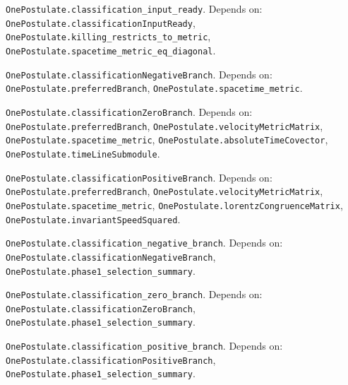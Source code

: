 \begin{lemma}\label{OnePostulate.classification_input_ready}
\texttt{OnePostulate.classification\_input\_ready}. Depends on: \texttt{OnePostulate.classificationInputReady}, \texttt{OnePostulate.killing\_restricts\_to\_metric}, \texttt{OnePostulate.spacetime\_metric\_eq\_diagonal}.
\end{lemma}

\begin{definition}\label{OnePostulate.classificationNegativeBranch}
\texttt{OnePostulate.classificationNegativeBranch}. Depends on: \texttt{OnePostulate.preferredBranch}, \texttt{OnePostulate.spacetime\_metric}.
\end{definition}

\begin{definition}\label{OnePostulate.classificationZeroBranch}
\texttt{OnePostulate.classificationZeroBranch}. Depends on: \texttt{OnePostulate.preferredBranch}, \texttt{OnePostulate.velocityMetricMatrix}, \texttt{OnePostulate.spacetime\_metric}, \texttt{OnePostulate.absoluteTimeCovector}, \texttt{OnePostulate.timeLineSubmodule}.
\end{definition}

\begin{definition}\label{OnePostulate.classificationPositiveBranch}
\texttt{OnePostulate.classificationPositiveBranch}. Depends on: \texttt{OnePostulate.preferredBranch}, \texttt{OnePostulate.velocityMetricMatrix}, \texttt{OnePostulate.spacetime\_metric}, \texttt{OnePostulate.lorentzCongruenceMatrix}, \texttt{OnePostulate.invariantSpeedSquared}.
\end{definition}

\begin{lemma}\label{OnePostulate.classification_negative_branch}
\texttt{OnePostulate.classification\_negative\_branch}. Depends on: \texttt{OnePostulate.classificationNegativeBranch}, \texttt{OnePostulate.phase1\_selection\_summary}.
\end{lemma}

\begin{lemma}\label{OnePostulate.classification_zero_branch}
\texttt{OnePostulate.classification\_zero\_branch}. Depends on: \texttt{OnePostulate.classificationZeroBranch}, \texttt{OnePostulate.phase1\_selection\_summary}.
\end{lemma}

\begin{lemma}\label{OnePostulate.classification_positive_branch}
\texttt{OnePostulate.classification\_positive\_branch}. Depends on: \texttt{OnePostulate.classificationPositiveBranch}, \texttt{OnePostulate.phase1\_selection\_summary}.
\end{lemma}

